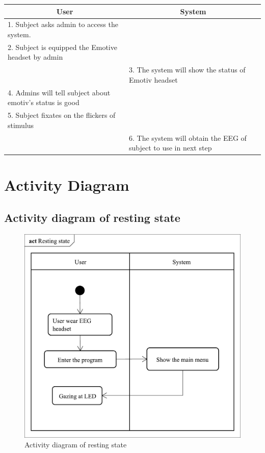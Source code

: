 \begin{itemize}
\begin{description}
	{
		\centering
		\begin{tabular}{| m{.47\linewidth} | m{.47\linewidth} |}
			
			\hline 
			\multicolumn{1}{|c}{\textbf{User}} & 
  			\multicolumn{1}{|c|}{\textbf{System}}\\
			\hline 
			1. Subject asks admin to access the system. &   \\
			\hline 
			2. Subject is equipped the Emotive headset by admin   &   \\
			\hline 
			& 3. The system will show the status of Emotiv headset \\
			\hline 
			4. Admins will tell subject about emotiv's status is good &  \\
			\hline
			5. Subject fixates on the flickers of stimulus &  \\
			\hline
			& 6. The system will obtain the EEG of subject to use in next step\\
			\hline
			
		\end{tabular}
	}
	
\end{description}



\end{itemize}

\newpage
\section{Activity Diagram}


\subsection{Activity diagram of resting state}

\begin{figure}[ht]
\centering \includegraphics[scale=0.31]{chapter4/Rest.pdf}
\caption{Activity diagram of resting state}
\end{figure}


